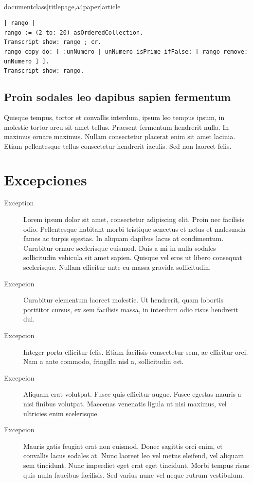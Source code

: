 \\documentclass[titlepage,a4paper]{article}
\begin{document}
\begin{verbatim}
| rango |
rango := (2 to: 20) asOrderedCollection.
Transcript show: rango ; cr.
rango copy do: [ :unNumero | unNumero isPrime ifFalse: [ rango remove: unNumero ] ].
Transcript show: rango.
\end{verbatim}

\subsection{Proin sodales leo dapibus sapien fermentum}
Quisque tempus, tortor et convallis interdum, ipsum leo tempus ipsum, in molestie tortor arcu sit amet tellus. Praesent fermentum hendrerit nulla. In maximus ornare maximus. Nullam consectetur placerat enim sit amet lacinia. Etiam pellentesque tellus consectetur hendrerit iaculis. Sed non laoreet felis.

\section{Excepciones}\label{sec:excepciones}

\begin{description}

\item[Exception] Lorem ipsum dolor sit amet, consectetur adipiscing elit. Proin nec facilisis odio. Pellentesque habitant morbi tristique senectus et netus et malesuada fames ac turpis egestas. In aliquam dapibus lacus at condimentum. Curabitur ornare scelerisque euismod. Duis a mi in nulla sodales sollicitudin vehicula sit amet sapien. Quisque vel eros ut libero consequat scelerisque. Nullam efficitur ante eu massa gravida sollicitudin.
\item[Excepcion] Curabitur elementum laoreet molestie. Ut hendrerit, quam lobortis porttitor cursus, ex sem facilisis massa, in interdum odio risus hendrerit dui.
\item[Excepcion] Integer porta efficitur felis. Etiam facilisis consectetur sem, ac efficitur orci. Nam a ante commodo, fringilla nisl a, sollicitudin est.
\item[Excepcion] Aliquam erat volutpat. Fusce quis efficitur augue. Fusce egestas mauris a nisi finibus volutpat. Maecenas venenatis ligula ut nisi maximus, vel ultricies enim scelerisque.
\item[Excepcion] Mauris gatis feugiat erat non euismod. Donec sagittis orci enim, et convallis lacus sodales at. Nunc laoreet leo vel metus eleifend, vel aliquam sem tincidunt. Nunc imperdiet eget erat eget tincidunt. Morbi tempus risus quis nulla faucibus facilisis. Sed varius nunc vel neque rutrum vestibulum.
\end{description}
\end{document}
